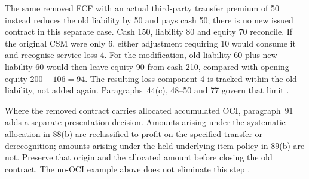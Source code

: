 The same removed FCF with an actual third-party transfer premium of 50
instead reduces the old liability by 50 and pays cash 50; there is no new
issued contract in this separate case. Cash 150, liability 80 and equity
70 reconcile. If the original CSM were only 6, either adjustment requiring
10 would consume it and recognise service loss 4. For the modification,
old liability 60 plus new liability 60 would then leave equity 90 from
cash 210, compared with opening equity \(200-106=94\). The resulting
loss component 4 is tracked within the old liability, not added again.
Paragraphs~44(c), 48--50 and 77 govern that limit
\citep[IFRS~17.44,48--50,77]{eu20231803}.

Where the removed contract carries allocated accumulated OCI, paragraph~91
adds a separate presentation decision. Amounts arising under the systematic
allocation in 88(b) are reclassified to profit on the specified transfer or
derecognition; amounts arising under the held-underlying-item policy in
89(b) are not. Preserve that origin and the allocated amount before closing
the old contract. The no-OCI example above does not eliminate this step
\citep[IFRS~17.91]{eu20231803}.
